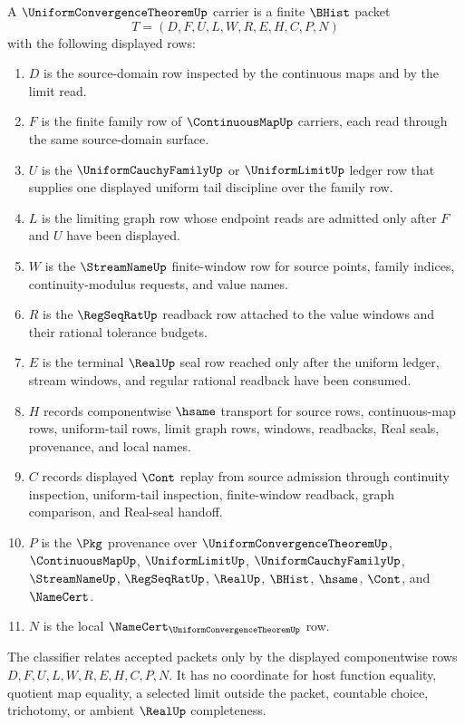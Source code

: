 \begin{definition}
\label{def:uniform-convergence-theorem-carrier}
A $\UniformConvergenceTheoremUp$ carrier is a finite $\BHist$ packet
$$
T=(D,F,U,L,W,R,E,H,C,P,N)
$$
with the following displayed rows:
\begin{enumerate}
\item $D$ is the source-domain row inspected by the continuous maps and by the limit read.
\item $F$ is the finite family row of $\ContinuousMapUp$ carriers, each read through the same source-domain surface.
\item $U$ is the $\UniformCauchyFamilyUp$ or $\UniformLimitUp$ ledger row that supplies one displayed uniform tail discipline over the family row.
\item $L$ is the limiting graph row whose endpoint reads are admitted only after $F$ and $U$ have been displayed.
\item $W$ is the $\StreamNameUp$ finite-window row for source points, family indices, continuity-modulus requests, and value names.
\item $R$ is the $\RegSeqRatUp$ readback row attached to the value windows and their rational tolerance budgets.
\item $E$ is the terminal $\RealUp$ seal row reached only after the uniform ledger, stream windows, and regular rational readback have been consumed.
\item $H$ records componentwise $\hsame$ transport for source rows, continuous-map rows, uniform-tail rows, limit graph rows, windows, readbacks, Real seals, provenance, and local names.
\item $C$ records displayed $\Cont$ replay from source admission through continuity inspection, uniform-tail inspection, finite-window readback, graph comparison, and Real-seal handoff.
\item $P$ is the $\Pkg$ provenance over $\UniformConvergenceTheoremUp$, $\ContinuousMapUp$, $\UniformLimitUp$, $\UniformCauchyFamilyUp$, $\StreamNameUp$, $\RegSeqRatUp$, $\RealUp$, $\BHist$, $\hsame$, $\Cont$, and $\NameCert$.
\item $N$ is the local $\NameCert_{\UniformConvergenceTheoremUp}$ row.
\end{enumerate}
The classifier relates accepted packets only by the displayed componentwise rows $D,F,U,L,W,R,E,H,C,P,N$. It has no coordinate for host function equality, quotient map equality, a selected limit outside the packet, countable choice, trichotomy, or ambient $\RealUp$ completeness.
\end{definition}

